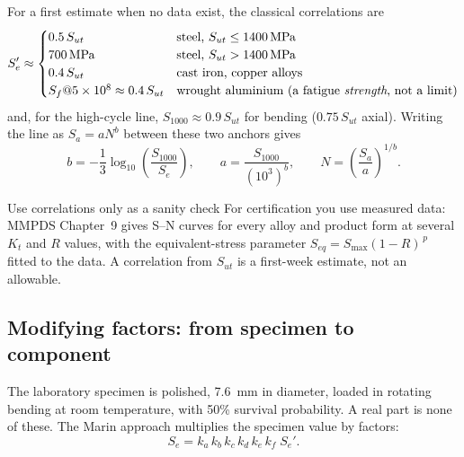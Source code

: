 \documentclass[11pt,a4paper]{article}
\begin{document}
For a first estimate when no data exist, the classical correlations are
\begin{equation}
  S_e' \approx
  \begin{cases}
    0.5\,S_{ut} & \text{steel, } S_{ut}\le\SI{1400}{MPa}\\
    \SI{700}{MPa} & \text{steel, } S_{ut}>\SI{1400}{MPa}\\
    0.4\,S_{ut} & \text{cast iron, copper alloys}\\
    S_{f}@5\times10^{8}\approx 0.4\,S_{ut} & \text{wrought aluminium (a fatigue \emph{strength}, not a limit)}
  \end{cases}
\end{equation}
and, for the high-cycle line, $S_{1000}\approx 0.9\,S_{ut}$ for bending ($0.75\,S_{ut}$ axial). Writing the line as $S_a=aN^{b}$ between these two anchors gives
\begin{equation}
  b=-\frac{1}{3}\log_{10}\!\left(\frac{S_{1000}}{S_e}\right),\qquad a=\frac{S_{1000}}{(10^{3})^{b}},\qquad
  N=\left(\frac{S_a}{a}\right)^{1/b}.
  \label{eq:snline}
\end{equation}

\begin{keybox}{Use correlations only as a sanity check}
For certification you use measured data: MMPDS Chapter~9 gives S--N curves for every alloy and product form at several $K_t$ and $R$ values, with the equivalent-stress parameter $S_{eq}=S_{\max}(1-R)^{\,p}$ fitted to the data. A correlation from $S_{ut}$ is a first-week estimate, not an allowable.
\end{keybox}

\subsection{Modifying factors: from specimen to component}
The laboratory specimen is polished, \SI{7.6}{mm} in diameter, loaded in rotating bending at room temperature, with 50\% survival probability. A real part is none of these. The Marin approach multiplies the specimen value by factors:
\begin{equation}
  S_e = k_a\,k_b\,k_c\,k_d\,k_e\,k_f\;S_e' .
  \label{eq:marin}
\end{equation}
\end{document}

